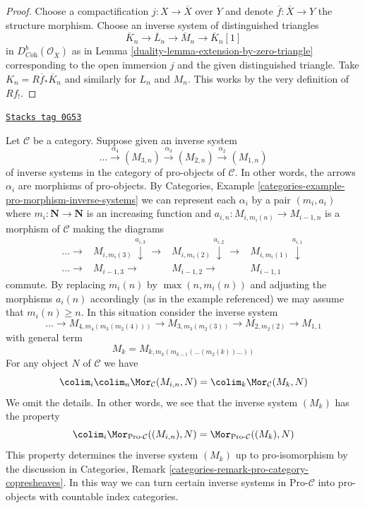 \begin{proof}

Choose a compactification $j : X \to \overline{X}$ over $Y$ and
denote $\overline{f} : \overline{X} \to Y$ the structure morphism.
Choose an inverse system of distinguished triangles
$$
\overline{K}_n \to \overline{L}_n \to \overline{M}_n \to \overline{K}_n[1]
$$
in $D^b_{\textit{Coh}}(\mathcal{O}_{\overline{X}})$ as in
Lemma \ref{duality-lemma-extension-by-zero-triangle} corresponding to the
open immersion $j$ and the given distinguished triangle. Take
$K_n = R\overline{f}_*\overline{K}_n$
and similarly for $L_n$ and $M_n$. This works by the very definition
of $Rf_!$.
\end{proof}

\begin{remark}
\label{duality-remark-compose-inverse-systems}
\href{https://stacks.math.columbia.edu/tag/0G53}{\texttt{Stacks tag 0G53}}

Let $\mathcal{C}$ be a category. Suppose given an inverse system
$$
\ldots \xrightarrow{\alpha_4} (M_{3, n}) \xrightarrow{\alpha_3} (M_{2, n})
\xrightarrow{\alpha_2} (M_{1, n})
$$
of inverse systems in the category of pro-objects of $\mathcal{C}$.
In other words, the arrows $\alpha_i$ are morphisms of pro-objects. By
Categories, Example \ref{categories-example-pro-morphism-inverse-systems}
we can represent each $\alpha_i$ by a pair $(m_i, a_i)$ where
$m_i : \mathbf{N} \to \mathbf{N}$ is an increasing function and
$a_{i, n} : M_{i, m_i(n)} \to M_{i - 1, n}$ is a morphism of $\mathcal{C}$
making the diagrams
$$
\begin{array}{cccc}\ldots \longrightarrow & M_{i, m_i(3)} \overset{a_{i, 3}}{\downarrow}\longrightarrow & M_{i, m_i(2)} \overset{a_{i, 2}}{\downarrow}\longrightarrow & M_{i, m_i(1)} \overset{a_{i, 1}}{\downarrow} \\ \ldots \longrightarrow & M_{i - 1, 3} \longrightarrow & M_{i - 1, 2} \longrightarrow & M_{i - 1, 1}\end{array}
$$
commute. By replacing $m_i(n)$ by $\max(n, m_i(n))$ and adjusting
the morphisms $a_i(n)$ accordingly (as in the example referenced)
we may assume that $m_i(n) \geq n$. In this situation consider the
inverse system
$$
\ldots \to
M_{4, m_4(m_3(m_2(4)))} \to
M_{3, m_3(m_2(3))} \to
M_{2, m_2(2)} \to
M_{1, 1}
$$
with general term
$$
M_k = M_{k, m_k(m_{k - 1}(\ldots (m_2(k))\ldots))}
$$
For any object $N$ of $\mathcal{C}$ we have
$$
\colim_i \colim_n \Mor_\mathcal{C}(M_{i, n}, N) =
\colim_k \Mor_\mathcal{C}(M_k, N)
$$
We omit the details. In other words, we see that the inverse system $(M_k)$
has the property
$$
\colim_i \Mor_{\text{Pro-}\mathcal{C}}((M_{i, n}), N) =
\Mor_{\text{Pro-}\mathcal{C}}((M_k), N)
$$
This property determines the inverse system $(M_k)$ up to pro-isomorphism
by the discussion in
Categories, Remark \ref{categories-remark-pro-category-copresheaves}.
In this way we can turn certain inverse systems in $\text{Pro-}\mathcal{C}$
into pro-objects with countable index categories.
\end{remark}

